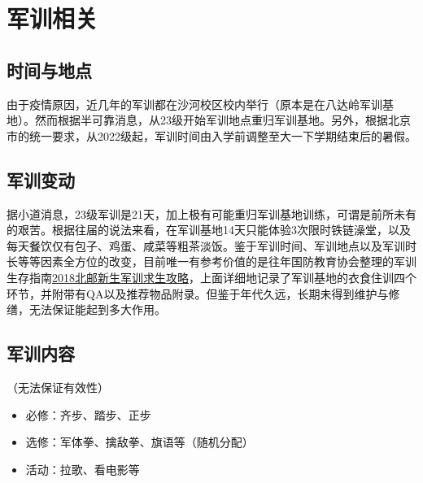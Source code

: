 \section{军训相关}

\subsection{时间与地点}

由于疫情原因，近几年的军训都在沙河校区校内举行（原本是在八达岭军训基地）。然而根据半可靠消息，从23级开始军训地点重归军训基地。另外，根据北京市的统一要求，从2022级起，军训时间由入学前调整至大一下学期结束后的暑假。
\subsection{军训变动}

据小道消息，23级军训是21天，加上极有可能重归军训基地训练，可谓是前所未有的艰苦。根据往届的说法来看，在军训基地14天只能体验3次限时铁链澡堂，以及每天餐饮仅有包子、鸡蛋、咸菜等粗茶淡饭。鉴于军训时间、军训地点以及军训时长等等因素全方位的改变，目前唯一有参考价值的是往年国防教育协会整理的军训生存指南\href{https://shimo.im/docs/473QMD0rGVc6MV3w/}{2018北邮新生军训求生攻略}，上面详细地记录了军训基地的衣食住训四个环节，并附带有QA以及推荐物品附录。但鉴于年代久远，长期未得到维护与修缮，无法保证能起到多大作用。

\subsection{军训内容}
（无法保证有效性）
\begin{itemize}
    \item 必修：齐步、踏步、正步
    \item 选修：军体拳、擒敌拳、旗语等（随机分配）
    \item 活动：拉歌、看电影等
\end{itemize}

